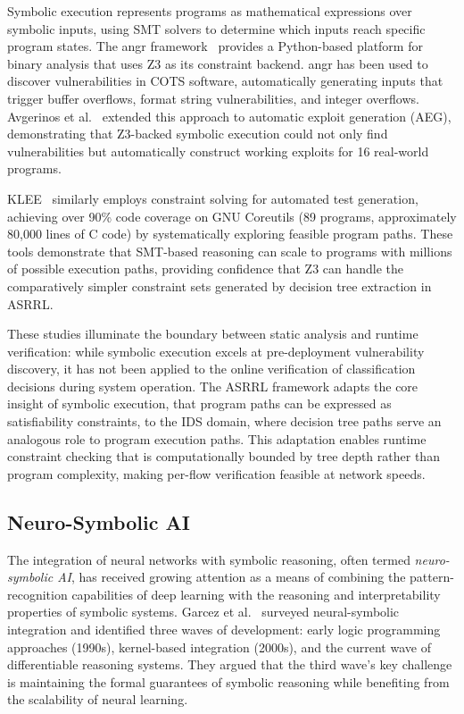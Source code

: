 \documentclass[12pt, letterpaper, oneside]{report}
\newcommand{\ASRRL}{\textsc{ASRRL}}
\begin{document}
Symbolic execution represents programs as mathematical expressions over symbolic inputs, using SMT solvers to determine which inputs reach specific program states. The angr framework~\cite{shoshitaishvili2016} provides a Python-based platform for binary analysis that uses Z3 as its constraint backend. angr has been used to discover vulnerabilities in COTS software, automatically generating inputs that trigger buffer overflows, format string vulnerabilities, and integer overflows. Avgerinos et al.~\cite{avgerinos2014} extended this approach to automatic exploit generation (AEG), demonstrating that Z3-backed symbolic execution could not only find vulnerabilities but automatically construct working exploits for 16 real-world programs.

KLEE~\cite{cadar2008} similarly employs constraint solving for automated test generation, achieving over 90\% code coverage on GNU Coreutils (89 programs, approximately 80,000 lines of C code) by systematically exploring feasible program paths. These tools demonstrate that SMT-based reasoning can scale to programs with millions of possible execution paths, providing confidence that Z3 can handle the comparatively simpler constraint sets generated by decision tree extraction in \ASRRL{}.

These studies illuminate the boundary between static analysis and runtime verification: while symbolic execution excels at pre-deployment vulnerability discovery, it has not been applied to the online verification of classification decisions during system operation. The \ASRRL{} framework adapts the core insight of symbolic execution, that program paths can be expressed as satisfiability constraints, to the IDS domain, where decision tree paths serve an analogous role to program execution paths. This adaptation enables runtime constraint checking that is computationally bounded by tree depth rather than program complexity, making per-flow verification feasible at network speeds.

\subsection{Neuro-Symbolic AI}

The integration of neural networks with symbolic reasoning, often termed \emph{neuro-symbolic AI}, has received growing attention as a means of combining the pattern-recognition capabilities of deep learning with the reasoning and interpretability properties of symbolic systems. Garcez et al.~\cite{garcez2019} surveyed neural-symbolic integration and identified three waves of development: early logic programming approaches (1990s), kernel-based integration (2000s), and the current wave of differentiable reasoning systems. They argued that the third wave's key challenge is maintaining the formal guarantees of symbolic reasoning while benefiting from the scalability of neural learning.
\end{document}
